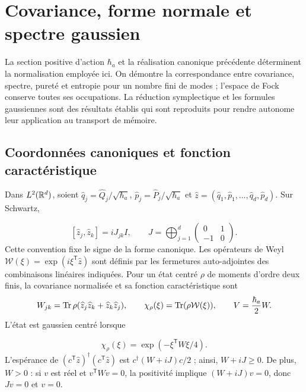 \section{Covariance, forme normale et spectre gaussien}
\label{app:gaussianas-espectro}

La section positive d’action \(\hbar_a\) et la réalisation canonique
précédente déterminent la normalisation employée ici. On démontre la
correspondance entre covariance, spectre, pureté et entropie pour un
nombre fini de modes ; l’espace de Fock conserve toutes ses occupations.
La réduction symplectique et les formules gaussiennes sont des résultats
établis qui sont reproduits pour rendre autonome leur application au
transport de mémoire.

\subsection{Coordonnées canoniques et fonction caractéristique}
Dans \(L^2(\mathbb R^d)\), soient \(\widehat q_j=\widehat Q_j/\sqrt{\hbar_a}\),
\(\widehat p_j=\widehat P_j/\sqrt{\hbar_a}\) et
\(\widehat z=(\widehat q_1,\widehat p_1,\ldots,\widehat q_d,\widehat p_d)\).
Sur Schwartz,

\[
 [\widehat z_j,\widehat z_k]=iJ_{jk}I,\qquad
 J=\bigoplus_{j=1}^d\begin{pmatrix}0&1\\-1&0\end{pmatrix}.
\]
Cette convention fixe le signe de la forme canonique. Les opérateurs de
Weyl \(\mathcal W(\xi)=\exp(i\xi^{\mathsf T}\widehat z)\) sont définis
par les fermetures auto-adjointes des combinaisons linéaires indiquées.
Pour un état centré \(\rho\) de moments d’ordre deux finis, la
covariance normalisée et sa fonction caractéristique sont
\[
 W_{jk}=\operatorname{Tr}\rho(\widehat z_j\widehat z_k+\widehat z_k\widehat z_j),
 \qquad \chi_\rho(\xi)=\operatorname{Tr}(\rho\mathcal W(\xi)),\qquad
 V=\frac{\hbar_a}{2}W.
\]
L’état est gaussien centré lorsque

\begin{equation}
 \chi_\rho(\xi)=\exp(-\xi^{\mathsf T}W\xi/4).
 \label{app:eq:caracteristica-gaussiana}
\end{equation}
L’espérance de \((c^{\mathsf T}\widehat z)^\dagger
(c^{\mathsf T}\widehat z)\) est \(c^\dagger(W+iJ)c/2\) ; ainsi,
\(W+iJ\geq0\). De plus, \(W>0\) : si \(v\) est réel et
\(v^{\mathsf T}Wv=0\), la positivité implique \((W+iJ)v=0\),
donc \(Jv=0\) et \(v=0\).



